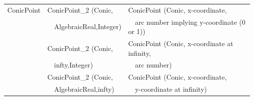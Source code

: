 \begin{ccTexOnly}
\begin{tabular}{*{3}{| l} |}

ConicPoint    & ConicPoint\_2 (Conic,  
                        & ConicPoint (Conic, x-coordinate, \\
              & \ \ AlgebraicReal,Integer)  
                        & \ \ arc number implying y-coordinate (0 or 1)) \\
              & ConicPoint\_2 (Conic,          
                        & ConicPoint (Conic, x-coordinate at infinity, \\
              & \ \ infty,Integer) 
                        & \ \ arc number) \\
              & ConicPoint\_2 (Conic,    
                        & ConicPoint (Conic, x-coordinate, \\
              & \ \ AlgebraicReal,infty) 
                        & \ \ y-coordinate at infinity) \\ \hline




\end{tabular}
\end{ccTexOnly}
